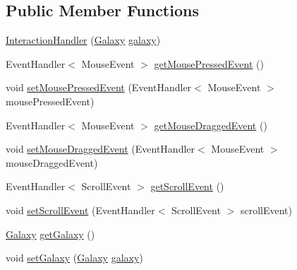 \subsection*{Public Member Functions}
\begin{DoxyCompactItemize}
\item 
\hyperlink{classfr_1_1projet_1_1groupe40_1_1client_1_1handler_1_1_interaction_handler_ac96a2cd52735f00717946ce4dae14c8a}{Interaction\+Handler} (\hyperlink{classfr_1_1projet_1_1groupe40_1_1model_1_1board_1_1_galaxy}{Galaxy} \hyperlink{classfr_1_1projet_1_1groupe40_1_1client_1_1handler_1_1_interaction_handler_a9cd8c67ac423a8a189cab902b148d934}{galaxy})
\item 
Event\+Handler$<$ Mouse\+Event $>$ \hyperlink{classfr_1_1projet_1_1groupe40_1_1client_1_1handler_1_1_interaction_handler_a65263a2e0561048e0d61acdddd55bd60}{get\+Mouse\+Pressed\+Event} ()
\item 
void \hyperlink{classfr_1_1projet_1_1groupe40_1_1client_1_1handler_1_1_interaction_handler_a04841979734da48633001c04b58c3570}{set\+Mouse\+Pressed\+Event} (Event\+Handler$<$ Mouse\+Event $>$ mouse\+Pressed\+Event)
\item 
Event\+Handler$<$ Mouse\+Event $>$ \hyperlink{classfr_1_1projet_1_1groupe40_1_1client_1_1handler_1_1_interaction_handler_a2d7a12f00289cacc345fed414a8aba71}{get\+Mouse\+Dragged\+Event} ()
\item 
void \hyperlink{classfr_1_1projet_1_1groupe40_1_1client_1_1handler_1_1_interaction_handler_a3d0a343f074cd2157863dbe47f786bf4}{set\+Mouse\+Dragged\+Event} (Event\+Handler$<$ Mouse\+Event $>$ mouse\+Dragged\+Event)
\item 
Event\+Handler$<$ Scroll\+Event $>$ \hyperlink{classfr_1_1projet_1_1groupe40_1_1client_1_1handler_1_1_interaction_handler_ad769e73c52ae29a54bfd6ee722fe4b1a}{get\+Scroll\+Event} ()
\item 
void \hyperlink{classfr_1_1projet_1_1groupe40_1_1client_1_1handler_1_1_interaction_handler_ad245d4139bc2ee3ea391d3709e2424f7}{set\+Scroll\+Event} (Event\+Handler$<$ Scroll\+Event $>$ scroll\+Event)
\item 
\hyperlink{classfr_1_1projet_1_1groupe40_1_1model_1_1board_1_1_galaxy}{Galaxy} \hyperlink{classfr_1_1projet_1_1groupe40_1_1client_1_1handler_1_1_interaction_handler_a92adf9509602623b1ff83accf6fcfd60}{get\+Galaxy} ()
\item 
void \hyperlink{classfr_1_1projet_1_1groupe40_1_1client_1_1handler_1_1_interaction_handler_a05733f4c93283eb97220d7f31fd38c3d}{set\+Galaxy} (\hyperlink{classfr_1_1projet_1_1groupe40_1_1model_1_1board_1_1_galaxy}{Galaxy} \hyperlink{classfr_1_1projet_1_1groupe40_1_1client_1_1handler_1_1_interaction_handler_a9cd8c67ac423a8a189cab902b148d934}{galaxy})
\end{DoxyCompactItemize}
